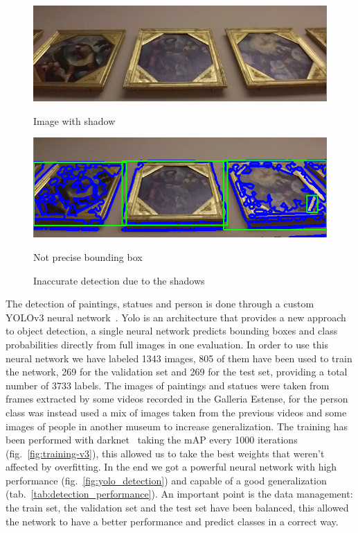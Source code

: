 \begin{figure}[h]
      \includegraphics[width=\linewidth]{pictures/painting_detection/shadow1.PNG}
      \caption*{Image with shadow}\label{fig:shadow1}
    \endminipage\hfill
      \includegraphics[width=\linewidth]{pictures/painting_detection/shadow2.PNG}
      \caption*{Not precise bounding box}\label{fig:shadow2}
    \endminipage\hfill
    \caption{Inaccurate detection due to the shadows}\label{fig:innaccurate_detection}
\end{figure}







The detection of paintings, statues and person is done through a custom YOLOv3 neural network~\cite{yolov3}.
Yolo is an architecture that provides a new approach to object detection, a single neural network predicts bounding boxes and class probabilities directly from full images in one evaluation.
In order to use this neural network we have labeled 1343 images, 805 of them have been used to train the network, 269 for the validation set and 269 for the test set, providing a total number of 3733 labels. The images of paintings and statues were taken from frames extracted by some videos recorded in the Galleria Estense, for the person class was instead used a mix of images taken from the previous videos and some images of people in another museum to increase generalization.
The training has been performed with darknet~\cite{darknet} taking the mAP every 1000 iterations (fig.~\ref{fig:training-v3}), this allowed us to take the best weights that weren't affected by overfitting.
In the end we got a powerful neural network with high performance (fig.~\ref{fig:yolo_detection}) and capable of a good generalization (tab.~\ref{tab:detection_performance}).
An important point is the data management: the train set, the validation set and the test set have been balanced, this allowed the network to have a better performance and predict classes in a correct way.



